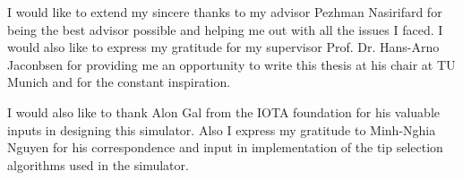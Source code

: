 I would like to extend my sincere thanks to my advisor Pezhman Nasirifard for being the best advisor possible and helping me out with all the issues I faced. I would also like to express my gratitude for my supervisor Prof. Dr. Hans-Arno Jaconbsen for providing me an opportunity to write this thesis at his chair at TU Munich and for the constant inspiration.

I would also like to thank Alon Gal from the IOTA foundation for his valuable inputs in designing this simulator. Also I express my gratitude to Minh-Nghia Nguyen for his correspondence and input in implementation of the tip selection algorithms used in the simulator.